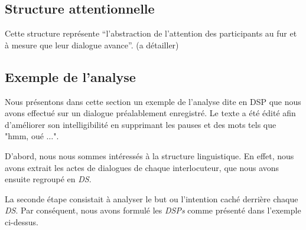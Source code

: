 	
		\subsection{Structure attentionnelle}
		
			Cette structure représente “l'abstraction de l'attention des participants au fur et à mesure que leur dialogue avance”. (a détailler)
		 
		 \subsection{Exemple de l'analyse}
			 Nous présentons dans cette section un exemple de l'analyse dite en DSP que nous avons effectué sur un dialogue préalablement enregistré. Le texte a été édité afin d'améliorer son intelligibilité en supprimant les pauses et des mots tels que "hmm, oué $\ldots$".
			 
			 D'abord, nous nous sommes intéressés à la structure linguistique. En effet, nous avons extrait les actes de dialogues de chaque interlocuteur, que nous avons ensuite regroupé en \emph{DS}. 
			 
			 La seconde étape consistait à analyser le but ou l'intention caché derrière chaque \emph{DS}. Par conséquent, nous avons formulé les \emph{DSPs} comme présenté dans l'exemple ci-dessus.	
			
